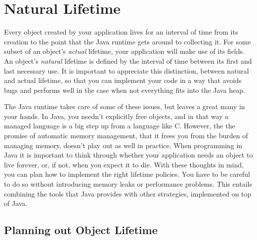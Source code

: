 \chapter{Natural Lifetime}

Every object created by your application lives for an interval of time from its
creation to the point that the Java runtime gets around to collecting it. For
some subset of an object's {\em actual} lifetime, your application will make use
of its fields. An object's {\em natural} lifetime is defined by the interval of
time between its first and last necessary use. %
It is important to appreciate this distinction, between natural and actual
lifetime, so that you can implement your code in a way that avoids bugs and
performs well in the case when not everything fits into the Java heap.

The Java runtime takes care of some of these issues, but leaves a great many in
your hands. In Java, you needn't explicitly free objects, and in that way a
managed language is a big step up from a language like C. However, the the
promise of automatic memory management, that it frees you from the burden of
managing memory, doesn't play out as well in practice. When programming in Java
it is important to think through whether your application needs an object to live
forever, or, if not, when you expect it to die. With these thoughts in mind, you
can plan how to  implement the right lifetime policies. You have to be careful
to do so without introducing memory leaks or performance problems. This entails
combining the tools that Java  provides with other strategies, implemented on
top of Java.


\section{Planning out Object Lifetime}

